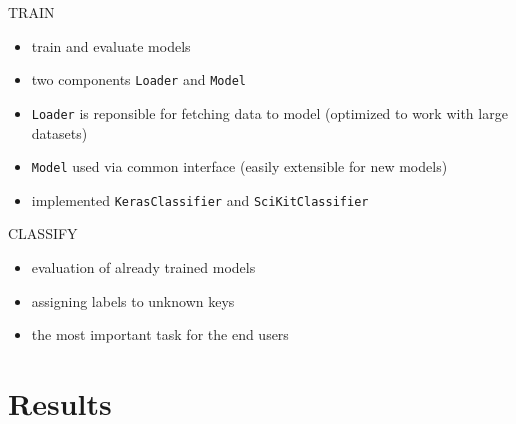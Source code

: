 \documentclass{beamer}
\begin{document}
\begin{darkframes}
    \begin{frame}{TRAIN}
      \begin{itemize}
        \item train and evaluate models
        \item two components \texttt{Loader} and \texttt{Model}
        \item \texttt{Loader} is reponsible for fetching data to model (optimized to work with large datasets)
        \item \texttt{Model} used via common interface (easily extensible for new models)
        \item implemented \texttt{KerasClassifier} and \texttt{SciKitClassifier}
      \end{itemize}
    \end{frame}

    \begin{frame}{CLASSIFY}
      \begin{itemize}
        \item evaluation of already trained models
        \item assigning labels to unknown keys
        \item the most important task for the end users
      \end{itemize}
    \end{frame}

    \section{Results}

\end{darkframes}
\end{document}
